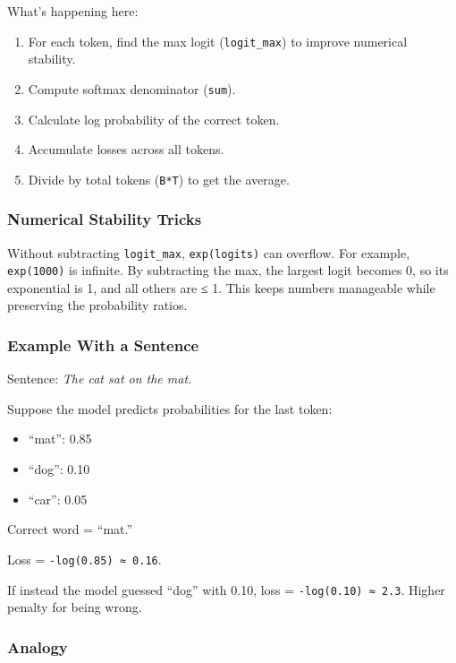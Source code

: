 \documentclass[
  letterpaper,
  DIV=11,
  numbers=noendperiod]{scrreprt}
\providecommand{\tightlist}{%
  \setlength{\itemsep}{0pt}\setlength{\parskip}{0pt}}
\begin{document}
What's happening here:

\begin{enumerate}
\def\labelenumi{\arabic{enumi}.}
\tightlist
\item
  For each token, find the max logit (\texttt{logit\_max}) to improve
  numerical stability.
\item
  Compute softmax denominator (\texttt{sum}).
\item
  Calculate log probability of the correct token.
\item
  Accumulate losses across all tokens.
\item
  Divide by total tokens (\texttt{B*T}) to get the average.
\end{enumerate}

\subsubsection{Numerical Stability
Tricks}\label{numerical-stability-tricks}

Without subtracting \texttt{logit\_max}, \texttt{exp(logits)} can
overflow. For example, \texttt{exp(1000)} is infinite. By subtracting
the max, the largest logit becomes 0, so its exponential is 1, and all
others are ≤ 1. This keeps numbers manageable while preserving the
probability ratios.

\subsubsection{Example With a Sentence}\label{example-with-a-sentence}

Sentence: \emph{The cat sat on the mat.}

Suppose the model predicts probabilities for the last token:

\begin{itemize}
\tightlist
\item
  ``mat'': 0.85
\item
  ``dog'': 0.10
\item
  ``car'': 0.05
\end{itemize}

Correct word = ``mat.''

Loss = \texttt{-log(0.85)\ ≈\ 0.16}.

If instead the model guessed ``dog'' with 0.10, loss =
\texttt{-log(0.10)\ ≈\ 2.3}. Higher penalty for being wrong.

\subsubsection{Analogy}\label{analogy-3}
\end{document}
